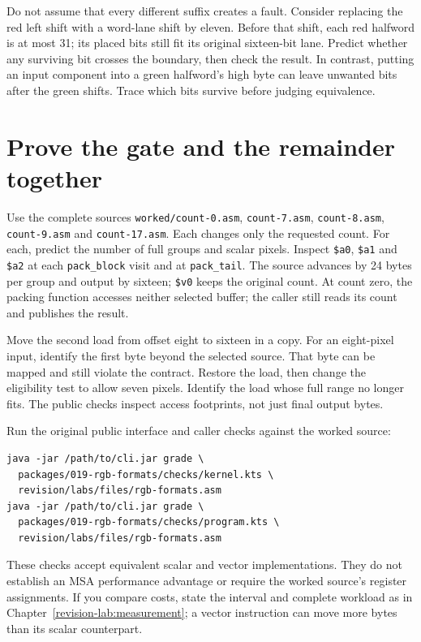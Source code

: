 Do not assume that every different suffix creates a fault. Consider replacing
the red left shift with a word-lane shift by eleven. Before that shift, each red
halfword is at most 31; its placed bits still fit its original sixteen-bit lane.
Predict whether any surviving bit crosses the boundary, then check the result.
In contrast, putting an input component into a green halfword's high byte can
leave unwanted bits after the green shifts. Trace which bits survive before
judging equivalence.

\section{Prove the gate and the remainder together}

Use the complete sources \texttt{worked/count-0.asm},
\texttt{count-7.asm}, \texttt{count-8.asm}, \texttt{count-9.asm} and
\texttt{count-17.asm}. Each changes only the requested count. For each, predict
the number of full groups and scalar pixels. Inspect \texttt{\$a0}, \texttt{\$a1} and
\texttt{\$a2} at each \texttt{pack\_block} visit and at \texttt{pack\_tail}.
The source advances by 24 bytes per group and output by sixteen; \texttt{\$v0}
keeps the original count. At count zero, the packing function accesses neither
selected buffer; the caller still reads its count and publishes the result.

Move the second load from offset eight to sixteen in a copy. For an eight-pixel
input, identify the first byte beyond the selected source. That byte can be mapped
and still violate the contract. Restore the load, then change the eligibility
test to allow seven pixels. Identify the load whose full range no longer fits.
The public checks inspect access footprints, not just final output bytes.

Run the original public interface and caller checks against the worked source:
\begin{verbatim}
java -jar /path/to/cli.jar grade \
  packages/019-rgb-formats/checks/kernel.kts \
  revision/labs/files/rgb-formats.asm
java -jar /path/to/cli.jar grade \
  packages/019-rgb-formats/checks/program.kts \
  revision/labs/files/rgb-formats.asm
\end{verbatim}
These checks accept equivalent scalar and vector implementations. They do not
establish an MSA performance advantage or require the worked source's register
assignments. If you compare costs, state the interval and complete workload as in
Chapter~\ref{revision-lab:measurement}; a vector instruction can move more bytes
than its scalar counterpart.

